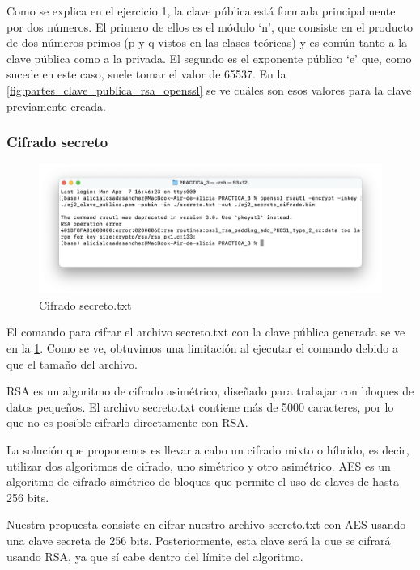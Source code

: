 Como se explica en el ejercicio 1, la clave pública está formada principalmente por dos números. El primero de ellos es el módulo ‘n’, que consiste en el producto de dos números primos (p y q vistos en las clases teóricas) y es común tanto a la clave pública como a la privada. El segundo es el exponente público ‘e’ que, como sucede en este caso, suele tomar el valor de 65537. En la \ref{fig:partes_clave_publica_rsa_openssl} se ve cuáles son esos valores para la clave previamente creada. 

\subsubsection{Cifrado secreto}

\begin{figure}[H]   
    \centering
    \includegraphics[width=\textwidth]{ej2_c.png}
    \caption{Cifrado secreto.txt}
    \label{fig:cifrado_secreto_openssl}
\end{figure}

El comando para cifrar el archivo secreto.txt con la clave pública generada se ve en la \ref{fig:cifrado_secreto_openssl}. Como se ve, obtuvimos una limitación al ejecutar el comando debido a que el tamaño del archivo.  

RSA es un algoritmo de cifrado asimétrico, diseñado para trabajar con bloques de datos pequeños. El archivo secreto.txt contiene más de 5000 caracteres, por lo que no es posible cifrarlo directamente con RSA. 

La solución que proponemos es llevar a cabo un cifrado mixto o híbrido, es decir, utilizar dos algoritmos de cifrado, uno simétrico y otro asimétrico. AES es un algoritmo de cifrado simétrico de bloques que permite el uso de claves de hasta 256 bits. 

Nuestra propuesta consiste en cifrar nuestro archivo secreto.txt con AES usando una clave secreta de 256 bits. Posteriormente, esta clave será la que se cifrará usando RSA, ya que sí cabe dentro del límite del algoritmo. 
